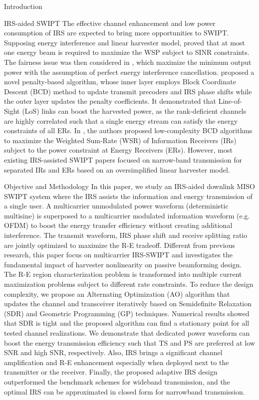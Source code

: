 \documentclass[journal]{IEEEtran}
\begin{document}
\begin{section}{Introduction}
		\begin{subsection}{IRS-aided SWIPT}
			The effective channel enhancement and low power consumption of IRS are expected to bring more opportunities to SWIPT. Supposing energy interference and linear harvester model, \cite{Wu2019b} proved that at most one energy beam is required to maximize the WSP subject to SINR constraints. The fairness issue was then considered in \cite{Tang2019}, which maximize the minimum output power with the assumption of perfect energy interference cancellation. \cite{Wu2019c} proposed a novel penalty-based algorithm, whose inner layer employs Block Coordinate Descent (BCD) method to update transmit precoders and IRS phase shifts while the outer layer updates the penalty coefficients. It demonstrated that Line-of-Sight (LoS) links can boost the harvested power, as the rank-deficient channels are highly correlated such that a single energy stream can satisfy the energy constraints of all ERs. In \cite{Pan2019a}, the authors proposed low-complexity BCD algorithms to maximize the Weighted Sum-Rate (WSR) of Information Receivers (IRs) subject to the power constraint at Energy Receivers (ERs). However, most existing IRS-assisted SWIPT papers focused on narrow-band transmission for separated IRs and ERs based on an oversimplified linear harvester model.
		\end{subsection}


		\begin{subsection}{Objective and Methodology}
			In this paper, we study an IRS-aided downlink MISO SWIPT system where the IRS assists the information and energy transmission of a single user. A multicarrier unmodulated power waveform (deterministic multisine) is superposed to a multicarrier modulated information waveform (e.g. OFDM) to boost the energy transfer efficiency without creating additional interference. The transmit waveform, IRS phase shift and receive splitting ratio are jointly optimized to maximize the R-E tradeoff. Different from previous research, this paper focus on multicarrier IRS-SWIPT and investigates the fundamental impact of harvester nonlinearity on passive beamforming design. The R-E region characterization problem is transformed into multiple current maximization problems subject to different rate constraints. To reduce the design complexity, we propose an Alternating Optimization (AO) algorithm that updates the channel and transceiver iteratively based on Semidefinite Relaxation (SDR) and Geometric Programming (GP) techniques. Numerical results showed that SDR is tight and the proposed algorithm can find a stationary point for all tested channel realizations. We demonstrate that dedicated power waveform can boost the energy transmission efficiency such that TS and PS are preferred at low SNR and high SNR, respectively. Also, IRS brings a significant channel amplification and R-E enhancement especially when deployed next to the transmitter or the receiver. Finally, the proposed adaptive IRS design outperformed the benchmark schemes for wideband transmission, and the optimal IRS can be approximated in closed form for narrowband transmission.


\end{subsection}
\end{section}
\end{document}
